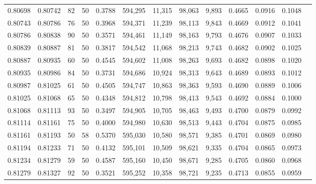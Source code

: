 \begin{tabular}{rrrrrrrrrrrrr}
0.80698 & 0.80742 &    82 &  50 &                                     0.3788 & 594,295 &  11,315 &  98,063 &   9,893 & 0.4665 & 0.0916 & 0.1048 \\
0.80743 & 0.80786 &    76 &  50 &                                     0.3968 & 594,371 &  11,239 &  98,113 &   9,843 & 0.4669 & 0.0912 & 0.1041 \\
0.80786 & 0.80838 &    90 &  50 &                                     0.3571 & 594,461 &  11,149 &  98,163 &   9,793 & 0.4676 & 0.0907 & 0.1033 \\
0.80839 & 0.80887 &    81 &  50 &                                     0.3817 & 594,542 &  11,068 &  98,213 &   9,743 & 0.4682 & 0.0902 & 0.1025 \\
0.80887 & 0.80935 &    60 &  50 &                                     0.4545 & 594,602 &  11,008 &  98,263 &   9,693 & 0.4682 & 0.0898 & 0.1020 \\
0.80935 & 0.80986 &    84 &  50 &                                     0.3731 & 594,686 &  10,924 &  98,313 &   9,643 & 0.4689 & 0.0893 & 0.1012 \\
0.80987 & 0.81025 &    61 &  50 &                                     0.4505 & 594,747 &  10,863 &  98,363 &   9,593 & 0.4690 & 0.0889 & 0.1006 \\
0.81025 & 0.81068 &    65 &  50 &                                     0.4348 & 594,812 &  10,798 &  98,413 &   9,543 & 0.4692 & 0.0884 & 0.1000 \\
0.81068 & 0.81113 &    93 &  50 &                                     0.3497 & 594,905 &  10,705 &  98,463 &   9,493 & 0.4700 & 0.0879 & 0.0992 \\
0.81114 & 0.81161 &    75 &  50 &                                     0.4000 & 594,980 &  10,630 &  98,513 &   9,443 & 0.4704 & 0.0875 & 0.0985 \\
0.81161 & 0.81193 &    50 &  58 &                                     0.5370 & 595,030 &  10,580 &  98,571 &   9,385 & 0.4701 & 0.0869 & 0.0980 \\
0.81194 & 0.81233 &    71 &  50 &                                     0.4132 & 595,101 &  10,509 &  98,621 &   9,335 & 0.4704 & 0.0865 & 0.0973 \\
0.81234 & 0.81279 &    59 &  50 &                                     0.4587 & 595,160 &  10,450 &  98,671 &   9,285 & 0.4705 & 0.0860 & 0.0968 \\
0.81279 & 0.81327 &    92 &  50 &                                     0.3521 & 595,252 &  10,358 &  98,721 &   9,235 & 0.4713 & 0.0855 & 0.0959 \\

\end{tabular}
